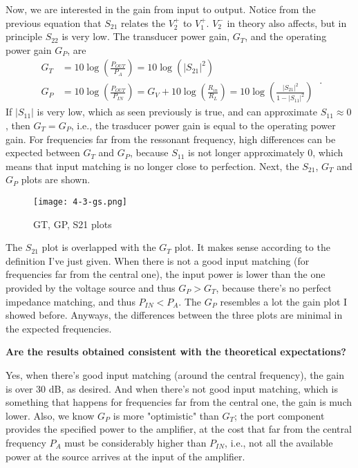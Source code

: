    \noindent Now, we are interested in the gain from input to output. Notice from the previous equation that $S_{21}$ relates the $V_2^+$ to $V_1^+$. $V_2^-$ in theory also affects, but in principle $S_{22}$ is very low. The transducer power gain, $G_T$, and the operating power gain $G_P$, are
   \begin{equation}
      \begin{split}
         G_T &= 10 \log \left( \frac{P_{OUT}}{P_A}\right) = 10 \log(|S_{21}|^2) \\
         G_P &= 10 \log \left(\frac{P_{OUT}}{P_{IN}}\right) = G_V + 10 \log \left( \frac{R_{in}}{R_{L}}\right) = 10 \log \left( \frac{|S_{21}|^2}{1 - |S_{11}|^2} \right)
      \end{split} \ .
   \end{equation}
   \noindent If $|S_{11}|$ is very low, which as seen previously is true, and can approximate $S_{11} \approx 0$, then $G_T = G_P$, i.e., the trasducer power gain is equal to the operating power gain. For frequencies far from the ressonant frequency, high differences can be expected between $G_T$ and $G_P$, because $S_{11}$ is not longer approximately $0$, which means that input matching is no longer close to perfection. Next, the $S_{21}$, $G_T$ and $G_P$ plots are shown.

\begin{figure} [H] \centering
   \texttt{[image: 4-3-gs.png]}
   \caption{GT, GP, S21 plots}
\end{figure}

\noindent The $S_{21}$ plot is overlapped with the $G_T$ plot. It makes sense according to the definition I've just given. When there is not a good input matching (for frequencies far from the central one), the input power is lower than the one provided by the voltage source and thus $G_P > G_T$, because there's no perfect impedance matching, and thus $P_{IN} < P_{A}$. The $G_P$ resembles a lot the gain plot I showed before. Anyways, the differences between the three plots are minimal in the expected frequencies.


\begin{pexbox}{}
   \noindent \textbf{Are the results obtained consistent with the theoretical expectations?}
\end{pexbox}

\noindent Yes, when there's good input matching (around the central frequency), the gain is over $30$ dB, as desired. And when there's not good input matching, which is something that happens for frequencies far from the central one, the gain is much lower. Also, we know $G_P$ is more "optimistic" than $G_T$; the port component provides the specified power to the amplifier, at the cost that far from the central frequency $P_A$ must be considerably higher than $P_{IN}$, i.e., not all the available power at the source arrives at the input of the amplifier.




